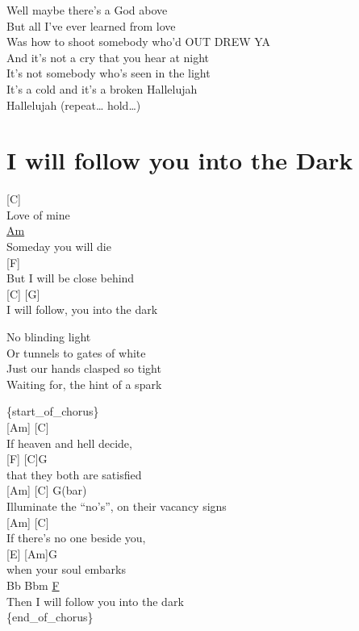 \documentclass[
  letterpaper,
  DIV=11,
  numbers=noendperiod]{scrreprt}
\begin{document}
Well maybe there's a God above\\
But all I've ever learned from love\\
Was how to shoot somebody who'd OUT DREW YA\\
And it's not a cry that you hear at night\\
It's not somebody who's seen in the light\\
It's a cold and it's a broken Hallelujah\\
Hallelujah (repeat\ldots{} hold\ldots)

\hypertarget{i-will-follow-you-into-the-dark}{%
\chapter{I will follow you into the
Dark}\label{i-will-follow-you-into-the-dark}}

{[}C{]}\\
Love of mine\\
\href{D\%20root\%20note}{Am}\\
Someday you will die\\
{[}F{]}\\
But I will be close behind\\
{[}C{]} {[}G{]}\\
I will follow, you into the dark

No blinding light\\
Or tunnels to gates of white\\
Just our hands clasped so tight\\
Waiting for, the hint of a spark

\{start\_of\_chorus\}\\
{[}Am{]} {[}C{]}\\
If heaven and hell decide,\\
{[}F{]} {[}C{]}G\\
that they both are satisfied\\
{[}Am{]} {[}C{]} G(bar)\\
Illuminate the ``no's'', on their vacancy signs\\
{[}Am{]} {[}C{]}\\
If there's no one beside you,\\
{[}E{]} {[}Am{]}G\\
when your soul embarks\\
Bb Bbm \href{C\%20root\%20note}{F}\\
Then I will follow you into the dark\\
\{end\_of\_chorus\}
\end{document}

